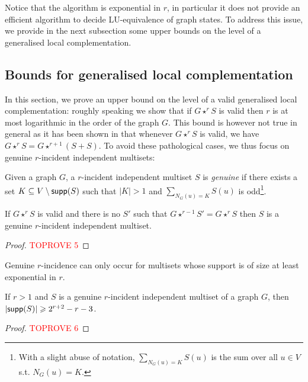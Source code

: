\documentclass[a4paper,UKenglish,cleveref,autoref,thm-restate]{arxiv}
\newcommand{\se}{\subseteq}
\newcommand{\gs}{\geqslant}
\newcommand{\sm}{\setminus}
\newcommand{\supp}{\textup{\textsf{supp}}}
\begin{document}
Notice that the algorithm is exponential in $r$, in particular it does not provide an efficient algorithm to decide LU-equivalence of graph states. To address this issue, we provide in the next subsection some upper bounds on the level of a generalised local complementation.


\subsection{Bounds for generalised local complementation} \label{subsec:bounds}


In this section, we prove an upper bound on the level of a valid generalised local complementation: roughly speaking we show that if $G\star^r S$ is valid then $r$ is at most logarithmic in the order of the graph $G$. This bound is however not true in general as it has been shown in \cite{claudet2024local} that whenever $G\star^r S$ is valid, we have $G\star^r S = G\star^{r+1} (S+S)$. To avoid these pathological cases, we thus focus on genuine $r$-incident independent multisets:


\begin{definition}
Given a graph $G$, a $r$-incident independent multiset $S$ is \emph{genuine} if there exists a set $K \se V \sm \supp(S)$ such that $|K|>1$ and $\sum_{N_{G}(u)=K}S(u)$ is odd\footnote{With a slight abuse of notation, $\sum_{N_{G}(u)=K}S(u)$ is the sum over all $u\in V$ s.t. $N_{G}(u)=K$.}. 
\end{definition}

\begin{proposition} \label{prop:nontrivial}
If $G\star^r S$ is valid and there is no $S'$ such that $G\star^{r-1} S' = G \star^r S$ then $S$ is a genuine $r$-incident independent multiset.    
\end{proposition}



\begin{proof}\textcolor{red}{TOPROVE 5}\end{proof}

Genuine $r$-incidence can only occur for multisets whose support is of size at least exponential in $r$.

\begin{lemma} \label{lemma:exp_support}
    If $r>1$ and $S$ is a genuine $r$-incident independent multiset of a graph $G$, then $|\supp(S)| \gs 2^{r+2}-r-3$.
\end{lemma}


\begin{proof}\textcolor{red}{TOPROVE 6}\end{proof}
\end{document}

